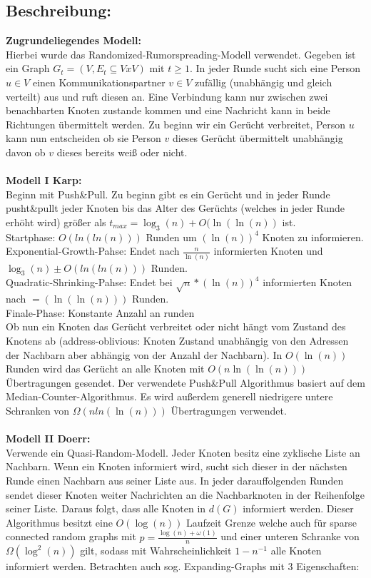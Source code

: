 \documentclass[12pt,a4paper]{report}
\begin{document}
\subsection*{Beschreibung:}
\textbf{Zugrundeliegendes Modell:}\\
 Hierbei wurde das Randomized-Rumorspreading-Modell verwendet. Gegeben ist ein Graph $G_t=(V,E_t \subseteq VxV)$ mit $t \ge 1$. In jeder Runde sucht sich eine Person $u \in V$ einen Kommunikationspartner $v \in V$ zufällig (unabhängig und gleich verteilt) aus und ruft diesen an. Eine Verbindung kann nur zwischen zwei benachbarten Knoten zustande kommen und eine Nachricht kann in beide Richtungen übermittelt werden. Zu beginn wir ein Gerücht verbreitet, Person $u$ kann nun entscheiden ob sie Person $v$ dieses Gerücht übermittelt unabhängig davon ob $v$ dieses bereits weiß oder nicht.\\
\\
\textbf{Modell I Karp:}\\
Beginn mit Push\&Pull. Zu beginn gibt es ein Gerücht und in jeder Runde pusht\&pullt jeder Knoten bis das Alter des Gerüchts (welches in jeder Runde erhöht wird) größer als $t_{max} = \log_3(n)+O(\ln(\ln(n))$ ist.\\
Startphase: $O(ln(ln(n)))$ Runden um $(\ln(n))^4$ Knoten zu informieren.\\
Exponential-Growth-Pahse: Endet nach $\frac{n}{\ln(n)}$ informierten Knoten und\\ $\log_3(n) \pm O(ln(ln(n)))$ Runden.\\
Quadratic-Shrinking-Pahse: Endet bei $\sqrt{n}*(\ln(n))^4$ informierten Knoten nach $=(\ln(\ln(n)))$ Runden.\\ 
Finale-Phase: Konstante Anzahl an runden\\
Ob nun ein Knoten das Gerücht verbreitet oder nicht hängt vom Zustand des Knotens ab (address-oblivious: Knoten Zustand unabhängig von den Adressen der Nachbarn aber abhängig von der Anzahl der Nachbarn). In $O(\ln(n))$ Runden wird das Gerücht an alle Knoten mit $O(n\ln(\ln(n)))$ Übertragungen gesendet. Der verwendete Push\&Pull Algorithmus basiert auf dem Median-Counter-Algorithmus. Es wird außerdem generell niedrigere untere Schranken von $\Omega (n ln(\ln(n)))$ Übertragungen verwendet.
\\
\\
\textbf{Modell II Doerr:}\\
Verwende ein Quasi-Random-Modell. Jeder Knoten besitz eine zyklische Liste an Nachbarn. Wenn ein Knoten informiert wird, sucht sich dieser in der nächsten Runde einen Nachbarn aus seiner Liste aus. In jeder darauffolgenden Runden sendet dieser Knoten weiter Nachrichten an die Nachbarknoten in der Reihenfolge seiner Liste. Daraus folgt, dass alle Knoten in $d(G)$ informiert werden. Dieser Algorithmus besitzt eine $O(\log(n))$ Laufzeit Grenze welche auch für sparse connected random graphs mit $p=\frac{\log(n)+\omega(1)}{n}$ und einer unteren Schranke von $\Omega(\log^2(n))$ gilt, sodass mit Wahrscheinlichkeit $1-n^{-1}$ alle Knoten informiert werden. Betrachten auch sog. Expanding-Graphs mit 3 Eigenschaften:\\
\end{document}
